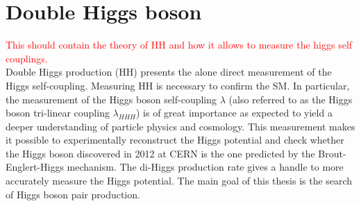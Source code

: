 \section{Double Higgs boson}
\label{chap1:HH}
\textcolor{red}{This should contain the theory of HH and how it allows to measure the higgs self couplings.
\\
}
Double Higgs production (HH) presents the alone direct measurement of the Higgs self-coupling.  Measuring HH is necessary to confirm the SM. In particular, the measurement of the Higgs boson self-coupling $\lambda$ (also referred to as the Higgs boson tri-linear coupling $\lambda_{HHH}$) is of great importance as expected to yield a deeper understanding of particle physics and cosmology. This measurement makes it possible to experimentally reconstruct the Higgs potential and check whether the Higgs boson discovered in 2012 at CERN is the one predicted by the Brout-Englert-Higgs mechanism. The di-Higgs production rate gives a handle to more accurately measure the Higgs potential. The main goal of this thesis is the search of Higgs boson pair production.
